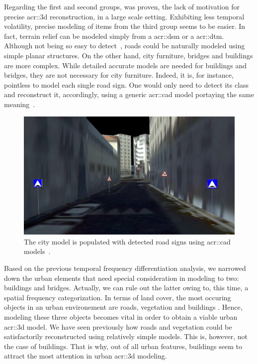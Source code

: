             Regarding the first and second groups, was proven, the lack of motivation for precise \gls{acr::3d} reconstruction, in a large scale setting.
            Exhibiting less temporal volatility, precise modeling of items from the third group seems to be easier.
            In fact, terrain relief can be modeled simply from a \gls{acr::dsm} or a \gls{acr::dtm}.
            Although not being so easy to detect~\parencite{mnih2010learning}, roads could be naturally modeled using simple planar structures.
            On the other hand, city furniture, bridges and buildings are more complex.
            While detailed accurate models are needed for buildings and bridges, they are not necessary for city furniture.
            Indeed, it is, for instance, pointless to model each single road sign.
            One would only need to detect its class and reconstruct it, accordingly, using a generic \gls{acr::cad} model portaying the same meaning~\parencite{soheilian2013detection}.\\
            \begin{figure}[htpb]
                \centering
                \includegraphics[width=\textwidth]{images/introduction/modeling_road_signs}
                \caption{
                    \label{fig::3d_road_signs_models} The city model is populated with detected road signs using \gls{acr::cad} models~\parencite{soheilian2013detection}.
                }
            \end{figure}

            Based on the previous temporal frequency differentiation analysis, we narrowed down the urban elements that need special consideration in modeling to two: buildings and bridges. 
            Actually, we can rule out the latter owing to, this time, a spatial frequency categorization.
            In terms of land cover, the most occuring objects in an urban environement are roads, vegetation and buildings \addref.
            Hence, modeling these three objects becomes vital in order to obtain a viable urban \gls{acr::3d} model.
            We have seen previously how roads and vegetation could be satisfactorily reconstructed using relatively simple models.
            This is, however, not the case of buildings.
            That is why, out of all urban features, buildings seem to attract the most attention in urban \gls{acr::3d} modeling.

